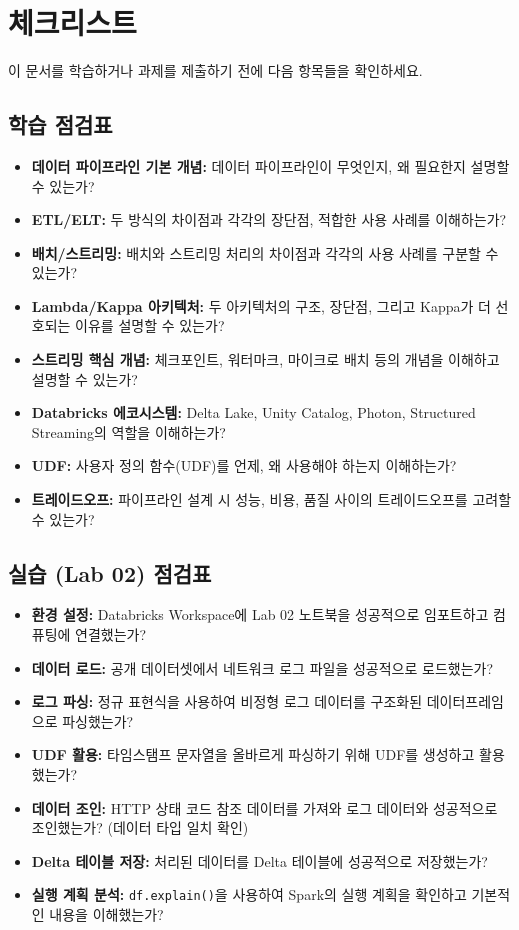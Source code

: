 \documentclass[11pt,a4paper]{article}
\theoremstyle{definition}
\begin{document}
\newpage
\section{체크리스트}

이 문서를 학습하거나 과제를 제출하기 전에 다음 항목들을 확인하세요.

\subsection{학습 점검표}
\begin{itemize}
    \item \textbf{데이터 파이프라인 기본 개념:} 데이터 파이프라인이 무엇인지, 왜 필요한지 설명할 수 있는가?
    \item \textbf{ETL/ELT:} 두 방식의 차이점과 각각의 장단점, 적합한 사용 사례를 이해하는가?
    \item \textbf{배치/스트리밍:} 배치와 스트리밍 처리의 차이점과 각각의 사용 사례를 구분할 수 있는가?
    \item \textbf{Lambda/Kappa 아키텍처:} 두 아키텍처의 구조, 장단점, 그리고 Kappa가 더 선호되는 이유를 설명할 수 있는가?
    \item \textbf{스트리밍 핵심 개념:} 체크포인트, 워터마크, 마이크로 배치 등의 개념을 이해하고 설명할 수 있는가?
    \item \textbf{Databricks 에코시스템:} Delta Lake, Unity Catalog, Photon, Structured Streaming의 역할을 이해하는가?
    \item \textbf{UDF:} 사용자 정의 함수(UDF)를 언제, 왜 사용해야 하는지 이해하는가?
    \item \textbf{트레이드오프:} 파이프라인 설계 시 성능, 비용, 품질 사이의 트레이드오프를 고려할 수 있는가?
\end{itemize}

\subsection{실습 (Lab 02) 점검표}
\begin{itemize}
    \item \textbf{환경 설정:} Databricks Workspace에 Lab 02 노트북을 성공적으로 임포트하고 컴퓨팅에 연결했는가?
    \item \textbf{데이터 로드:} 공개 데이터셋에서 네트워크 로그 파일을 성공적으로 로드했는가?
    \item \textbf{로그 파싱:} 정규 표현식을 사용하여 비정형 로그 데이터를 구조화된 데이터프레임으로 파싱했는가?
    \item \textbf{UDF 활용:} 타임스탬프 문자열을 올바르게 파싱하기 위해 UDF를 생성하고 활용했는가?
    \item \textbf{데이터 조인:} HTTP 상태 코드 참조 데이터를 가져와 로그 데이터와 성공적으로 조인했는가? (데이터 타입 일치 확인)
    \item \textbf{Delta 테이블 저장:} 처리된 데이터를 Delta 테이블에 성공적으로 저장했는가?
    \item \textbf{실행 계획 분석:} \texttt{df.explain()}을 사용하여 Spark의 실행 계획을 확인하고 기본적인 내용을 이해했는가?
\end{itemize}
\end{document}
